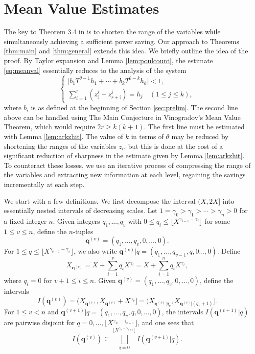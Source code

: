 \documentclass[11pt,reqno]{amsart}
\numberwithin{equation}{section}
\begin{document}
\section{Mean Value Estimates} \label{sec:meanval}

The key to Theorem 3.4 in \cite{Poulias1} is to shorten the range of the variables while simultaneously achieving a sufficient power saving. Our approach to Theorems \ref{thm:main} and \ref{thm:general} extends this idea. We briefly outline the idea of the proof. By Taylor expansion and Lemma \ref{lem:poulcount}, the estimate \ref{eq:meanval} essentially reduces to the analysis of the system 
\[  \begin{cases}
      \Big|b_1 T^{\theta-1}h_1+\cdots+b_k T^{\theta-k}h_k| < 1,  \\
      \sum_{i=1}^{r} (z_i^j-z_{r+i}^j) = h_j \quad (1 \leq j \leq k),
    \end{cases} 
\] 
where $b_i$ is as defined at the beginning of Section \ref{sec:prelim}. The second line above can be handled using The Main Conjecture in Vinogradov's Mean Value Theorem, which would require $2r \geq k(k+1)$. The first line must be estimated with Lemma \ref{lem:arkzhit}. The value of $k$ in terms of $\theta$ may be reduced by shortening the ranges of the variables $z_i$, but this is done at the cost of a significant reduction of sharpness in the estimate given by Lemma \ref{lem:arkzhit}. To counteract these losses, we use an iterative process of compressing the range of the variables and extracting new information at each level, regaining the savings incrementally at each step. 

We start with a few definitions. We first decompose the interval $(X,2X]$ into essentially nested intervals of decreasing scales. Let $1 = \gamma_0 > \gamma_1 > \cdots > \gamma_n > 0$ for a fixed integer $n$. 
Given integers $q_1,\ldots,q_v$ with $0 \leq q_i \leq \lfloor X^{\gamma_{i-1}-\gamma_i} \rfloor$ for some $1 \leq v \leq n$, define the $n$-tuples 
\[ \mathbf{q}^{(v)} = (q_1,\ldots,q_v,0,\ldots,0).\]
For $1 \leq q \leq \lfloor X^{\gamma_{v-1}-\gamma_v} \rfloor$, we also write $\mathbf{q}^{(v)}|q = (q_1,\ldots, q_{v-1},q,0\ldots,0) $. Define 
\[ X_{\mathbf{q}^{(v)}} = X +\sum_{i=1}^v q_iX^{\gamma_i} = X +\sum_{i=1}^n q_iX^{\gamma_i}, \]
where $q_i = 0$ for $v+1 \leq i \leq n$. 
Given $\mathbf{q}^{(v)} = (q_1,\ldots,q_v,0,\ldots,0)$, define the intervals 
\[I(\mathbf{q}^{(v)}) = (X_{\mathbf{q}^{(v)}},X_{\mathbf{q}^{(v)}}+X^{\gamma_v}] = (X_{\mathbf{q}^{(v)}|{q_v}},X_{\mathbf{q}^{(v)}|(q_{v}+1)}].\] 
For $1 \leq v < n$ and $\mathbf{q}^{(v+1)}|q = (q_1,\ldots,q_v,q,0,\ldots,0)$, the intervals $I(\mathbf{q}^{(v+1)}|q)$ are pairwise disjoint for $q = 0, \ldots, \lfloor X^{\gamma_{h}-\gamma_{v+1}} \rfloor$, and one sees that 
\[ I({\mathbf{q}^{(v)}}) \subseteq \bigsqcup_{q=0}^{\lfloor X^{\gamma_{v}-\gamma_{v+1}} \rfloor} I({\mathbf{q}^{(v+1)}|q}). \]
\end{document}
